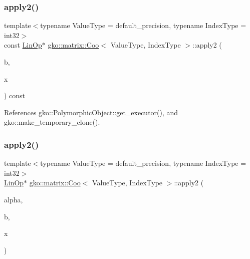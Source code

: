 \subsubsection{\texorpdfstring{apply2()}{apply2()}\hspace{0.1cm}{\footnotesize\ttfamily [2/4]}}
{\footnotesize\ttfamily template$<$typename Value\+Type = default\+\_\+precision, typename Index\+Type = int32$>$ \\
const \hyperlink{classgko_1_1LinOp}{Lin\+Op}$\ast$ \hyperlink{classgko_1_1matrix_1_1Coo}{gko\+::matrix\+::\+Coo}$<$ Value\+Type, Index\+Type $>$\+::apply2 (\begin{DoxyParamCaption}\item[{const \hyperlink{classgko_1_1LinOp}{Lin\+Op} $\ast$}]{b,  }\item[{\hyperlink{classgko_1_1LinOp}{Lin\+Op} $\ast$}]{x }\end{DoxyParamCaption}) const\hspace{0.3cm}{\ttfamily [inline]}}







References gko\+::\+Polymorphic\+Object\+::get\+\_\+executor(), and gko\+::make\+\_\+temporary\+\_\+clone().

\mbox{\label{classgko_1_1matrix_1_1Coo_a549dafbe9245e3fcef3b02c4d6914c84}} 
\subsubsection{\texorpdfstring{apply2()}{apply2()}\hspace{0.1cm}{\footnotesize\ttfamily [3/4]}}
{\footnotesize\ttfamily template$<$typename Value\+Type = default\+\_\+precision, typename Index\+Type = int32$>$ \\
\hyperlink{classgko_1_1LinOp}{Lin\+Op}$\ast$ \hyperlink{classgko_1_1matrix_1_1Coo}{gko\+::matrix\+::\+Coo}$<$ Value\+Type, Index\+Type $>$\+::apply2 (\begin{DoxyParamCaption}\item[{const \hyperlink{classgko_1_1LinOp}{Lin\+Op} $\ast$}]{alpha,  }\item[{const \hyperlink{classgko_1_1LinOp}{Lin\+Op} $\ast$}]{b,  }\item[{\hyperlink{classgko_1_1LinOp}{Lin\+Op} $\ast$}]{x }\end{DoxyParamCaption})\hspace{0.3cm}{\ttfamily [inline]}}



